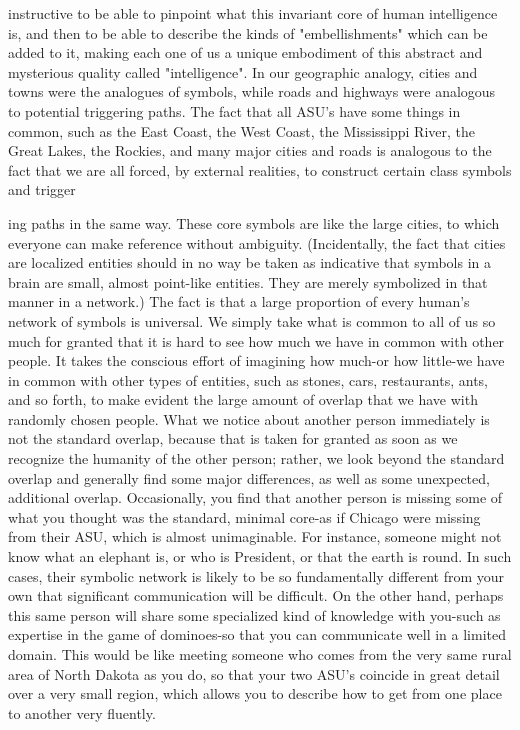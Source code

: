 instructive to be able to pinpoint what this invariant core of human intelligence is, and
then to be able to describe the kinds of "embellishments" which can be added to it,
making each one of us a unique embodiment of this abstract and mysterious quality
called "intelligence".
        In our geographic analogy, cities and towns were the analogues of symbols, while
roads and highways were analogous to potential triggering paths. The fact that all ASU's
have some things in common, such as the East Coast, the West Coast, the Mississippi
River, the Great Lakes, the Rockies, and many major cities and roads is analogous to the
fact that we are all forced, by external realities, to construct certain class symbols and
trigger





ing paths in the same way. These core symbols are like the large cities, to which everyone
can make reference without ambiguity. (Incidentally, the fact that cities are localized
entities should in no way be taken as indicative that symbols in a brain are small, almost
point-like entities. They are merely symbolized in that manner in a network.)
        The fact is that a large proportion of every human's network of symbols is
universal. We simply take what is common to all of us so much for granted that it is hard
to see how much we have in common with other people. It takes the conscious effort of
imagining how much-or how little-we have in common with other types of entities, such
as stones, cars, restaurants, ants, and so forth, to make evident the large amount of
overlap that we have with randomly chosen people. What we notice about another person
immediately is not the standard overlap, because that is taken for granted as soon as we
recognize the humanity of the other person; rather, we look beyond the standard overlap
and generally find some major differences, as well as some unexpected, additional
overlap.
        Occasionally, you find that another person is missing some of what you thought
was the standard, minimal core-as if Chicago were missing from their ASU, which is
almost unimaginable. For instance, someone might not know what an elephant is, or who
is President, or that the earth is round. In such cases, their symbolic network is likely to
be so fundamentally different from your own that significant communication will be
difficult. On the other hand, perhaps this same person will share some specialized kind of
knowledge with you-such as expertise in the game of dominoes-so that you can
communicate well in a limited domain. This would be like meeting someone who comes
from the very same rural area of North Dakota as you do, so that your two ASU's
coincide in great detail over a very small region, which allows you to describe how to get
from one place to another very fluently.

